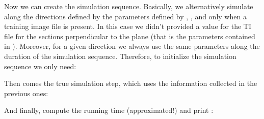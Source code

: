 \documentclass[letterpaper,10pt,english]{sphinxmanual}
\begin{document}
\begin{sphinxVerbatim}[commandchars=\\\{\}]
  
\PYG{p}{[}\PYG{p}{]}  \PYG{p}{[}\PYG{p}{]}
\end{sphinxVerbatim}

Now we can create the simulation sequence. Basically, we alternatively
simulate along the directions defined by the parameters defined by
, , and  only when a training
image file is present. In this case we didn’t provided a value for the
TI file for the sections perpendicular to the plane  (that is the
parameters contained in ). Moreover, for a given
direction we always use the same parameters along the duration of the
simulation sequence. Therefore, to initialize the simulation sequence
we only need:

\begin{sphinxVerbatim}[commandchars=\\\{\}]
     
\end{sphinxVerbatim}

Then comes the true simulation step, which uses the information
collected in the previous ones:

\begin{sphinxVerbatim}[commandchars=\\\{\}]
     
\end{sphinxVerbatim}

And finally, compute the running time (approximated!) and print :
\end{document}
